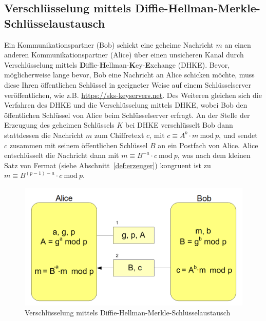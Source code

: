 \documentclass[
  a4paper,
  11pt,
]{scrartcl}
\theoremstyle{plain}
\theoremstyle{definition}
\theoremstyle{remark}
\newcommand{\Mod}[1]{\ \mathrm{mod}\ #1}
\begin{document}
\subsection{Verschlüsselung mittels Diffie-Hellman-Merkle-Schlüsselaustausch}
\label{sub:enc_with_dhke}
Ein Kommunikationspartner (Bob) schickt eine geheime Nachricht $m$ an einen anderen Kommunikationspartner (Alice) über einen unsicheren Kanal durch Verschlüsselung mittels \textbf{D}iffie-\textbf{H}ellman-\textbf{K}ey-\textbf{E}xchange (DHKE). Bevor, möglicherweise lange bevor, Bob eine Nachricht an Alice schicken möchte, muss diese Ihren öffentlichen Schlüssel in geeigneter Weise auf einem Schlüsselserver veröffentlichen, wie z.B. \url{https://sks-keyservers.net}. Des Weiteren gleichen sich die Verfahren des DHKE und die Verschlüsselung mittels DHKE, wobei Bob den öffentlichen Schlüssel von Alice beim Schlüsselserver erfragt. An der Stelle der Erzeugung des geheimen Schlüssels $K$ bei DHKE verschlüsselt Bob dann stattdessen die Nachricht $m$ zum Chiffretext $c$, mit $c \equiv A^b \cdot m \Mod{p}$, und sendet $c$ zusammen mit seinem öffentlichen Schlüssel $B$ an ein Postfach von Alice. Alice entschlüsselt die Nachricht dann mit $m \equiv  B^{-a}\cdot c  \Mod{p}$, was nach dem kleinen Satz von Fermat (siehe Abschnitt~\ref{def:erzeuger}) kongruent ist zu $m \equiv B^{(p-1)-a}\cdot c \Mod{p}$.

\begin{figure}[H]
  \centering
  \includegraphics[width=\textwidth]{DHKE_enc.png}
  \caption{Verschlüsselung mittels Diffie-Hellman-Merkle-Schlüsselaustausch}
  \label{fig:enc_with_dhke}
\end{figure}
\end{document}
